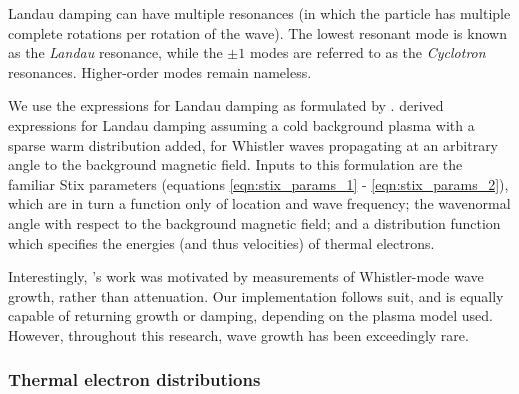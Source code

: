 Landau damping can have multiple resonances (in which the particle has multiple complete rotations per rotation of the wave). The lowest resonant mode is known as the \emph{Landau} resonance, while the $\pm 1$ modes are referred to as the \emph{Cyclotron} resonances. Higher-order modes remain nameless.

We use the expressions for Landau damping as formulated by \cite{Brinca1972}. \citeauthor{Brinca1972} derived expressions for Landau damping assuming a cold background plasma with a sparse warm distribution added, for Whistler waves propagating at an arbitrary angle to the background magnetic field. Inputs to this formulation are the familiar Stix parameters (equations \ref{eqn:stix_params_1} - \ref{eqn:stix_params_2}), which are in turn a function only of location and wave frequency; the wavenormal angle with respect to the background magnetic field; and a distribution function which specifies the energies (and thus velocities) of thermal electrons.

Interestingly, \citeauthor{Brinca1972}'s work was motivated by measurements of Whistler-mode wave growth, rather than attenuation. Our implementation follows suit, and is equally capable of returning growth or damping, depending on the plasma model used. However, throughout this research, wave growth has been exceedingly rare.

\subsubsection{Thermal electron distributions}




